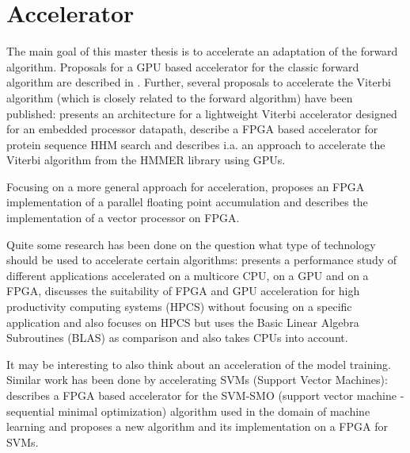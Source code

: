\documentclass[mscthesis]{usiinfthesis}
\begin{document}
\section{Accelerator}
\label{ch:art_acc}
The main goal of this master thesis is to accelerate an adaptation of the
forward algorithm. Proposals for a GPU based accelerator for the classic
forward algorithm are described in \cite{neumann11,liu09}. Further, several
proposals to accelerate the Viterbi algorithm (which is closely related to the
forward algorithm) have been published: \cite{ASAP12_Azhar} presents an
architecture for a lightweight Viterbi accelerator designed for an embedded
processor datapath, \cite{IPDPS07_Jacob,ICS06_Maddimsetty,IPDPS07_Oliver}
describe a FPGA based accelerator for protein sequence HHM search and
\cite{IPDPS09_Walters} describes i.a. an approach to accelerate the Viterbi
algorithm from the HMMER library using GPUs.

Focusing on a more general approach for acceleration, \cite{ARITH13_Kadric}
proposes an FPGA implementation of a parallel floating point accumulation and
\cite{ITNG07_Yang} describes the implementation of a vector processor on
FPGA.

Quite some research has been done on the question what type of technology
should be used to accelerate certain algorithms: \cite{SASP08_Che} presents
a performance study of different applications accelerated on a multicore CPU,
on a GPU and on a FPGA, \cite{FPL10_Jones} discusses the suitability of FPGA
and GPU acceleration for high productivity computing systems (HPCS) without
focusing on a specific application and \cite{ISVLSI10_Kestur} also focuses on
HPCS but uses the Basic Linear Algebra Subroutines (BLAS) as comparison and
also takes CPUs into account.

It may be interesting to also think about an acceleration of the model
training. Similar work has been done by accelerating SVMs (Support Vector Machines):
\cite{FCCM09_Cadambi} describes a FPGA based accelerator for the SVM-SMO
(support vector machine - sequential minimal optimization) algorithm used in
the domain of machine learning and \cite{IEEE03_Anguita} proposes a new algorithm
and its implementation on a FPGA for SVMs.

\end{document}
